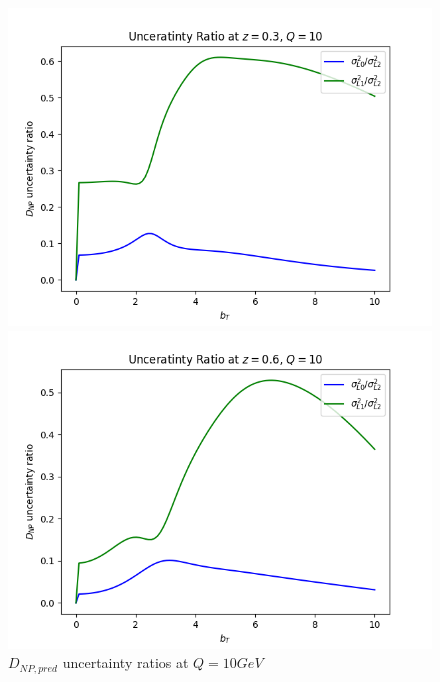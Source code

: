 \documentclass{article}
\begin{document}
\begin{itemize}
    \begin{figure}[H]
    \centering
    \begin{minipage}{0.45\textwidth}
        \centering
        \includegraphics[width=\textwidth]{Images/unc_ratios/unc_ratio_D_NP_Q_10_z_0.3.png}
        \caption{$z = 0.3$}
    \end{minipage}\hfill
    \begin{minipage}{0.45\textwidth}
        \centering
        \includegraphics[width=\textwidth]{Images/unc_ratios/unc_ratio_D_NP_Q_10_z_0.6.png}
        \caption{$z=0.6$}
    \end{minipage}
    \caption{$D_{NP, pred}$ uncertainty ratios at $Q = 10 GeV$}
    \end{figure}


\end{itemize}
\end{document}
